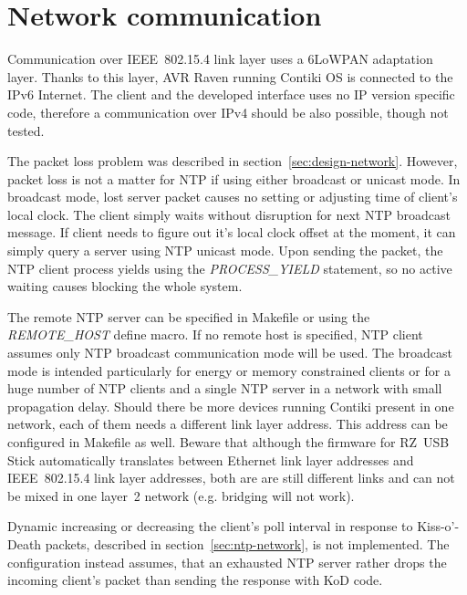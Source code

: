 
\section{Network communication}
Communication over IEEE~802.15.4 link layer uses a 6LoWPAN adaptation layer.
Thanks to this layer, AVR Raven running Contiki OS is connected to the IPv6 Internet.
The client and the developed interface uses no IP version specific code,
therefore a communication over IPv4 should be also possible, though not tested.

The packet loss problem was described in section~\ref{sec:design-network}.
However, packet loss is not a matter for NTP if using either broadcast or unicast mode.
In broadcast mode, lost server packet causes no setting or adjusting time of client's
local clock.
The client simply waits without disruption for next NTP broadcast message.
If client needs to figure out it's local clock offset at the moment,
it can simply query a server using NTP unicast mode.
Upon sending the packet, the NTP client process yields
using the {\it{PROCESS\_YIELD}} statement, so no active waiting
causes blocking the whole system.

The remote NTP server can be specified in Makefile or
using the {\it{REMOTE\_HOST}} define macro.
If no remote host is specified,
NTP client assumes only NTP broadcast communication mode will be used.
The broadcast mode is intended particularly for energy or memory constrained clients
or for a huge number of NTP clients and a single NTP server
in a network with small propagation delay.
Should there be more devices running Contiki present in one network,
each of them needs a different link layer address.
This address can be configured in Makefile as well.
Beware that although the firmware for RZ~USB Stick automatically translates
between Ethernet link layer addresses and IEEE~802.15.4 link layer
addresses, both are are still different links and can not be mixed in one
layer~2 network (e.g. bridging will not work).

Dynamic increasing or decreasing the client's poll interval in response to
Kiss-o'-Death packets, described in section~\ref{sec:ntp-network}, is not implemented.
The configuration instead assumes, that an exhausted NTP server rather drops the incoming
client's packet than sending the response with KoD code.
